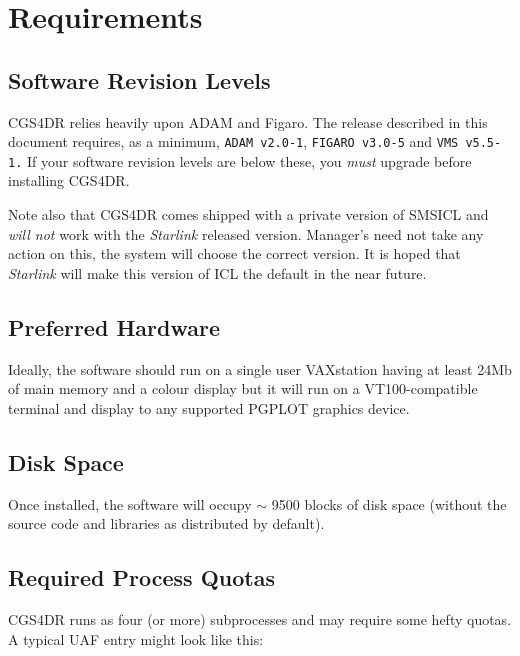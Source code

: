 \section{Requirements}

\subsection{Software Revision Levels}

CGS4DR relies heavily upon ADAM and Figaro. The release described in this
document requires, as a minimum, {\tt ADAM v2.0-1}, {\tt FIGARO v3.0-5} and 
{\tt VMS v5.5-1.} If your software revision levels are below these, you 
{\em must} upgrade before installing CGS4DR. 

Note also that CGS4DR comes shipped with a private version of SMSICL and 
{\em will not} work with the {\sl Starlink} released version. Manager's
need not take any action on this, the system will choose the correct version.
It is hoped that {\sl Starlink} will make this version of ICL the default
in the near future.

\subsection{Preferred Hardware}

Ideally, the software should run on a single user VAXstation having
at least 24Mb of main memory and a colour display but it will run on a 
VT100-compatible terminal and display to any supported PGPLOT graphics device.

\subsection{Disk Space}

Once installed, the software will occupy $\sim$ 9500 blocks of disk space
(without the source code and libraries as distributed by default).

\subsection{Required Process Quotas}

CGS4DR runs as four (or more) subprocesses and may require
some hefty quotas. A typical UAF entry might look like this:


